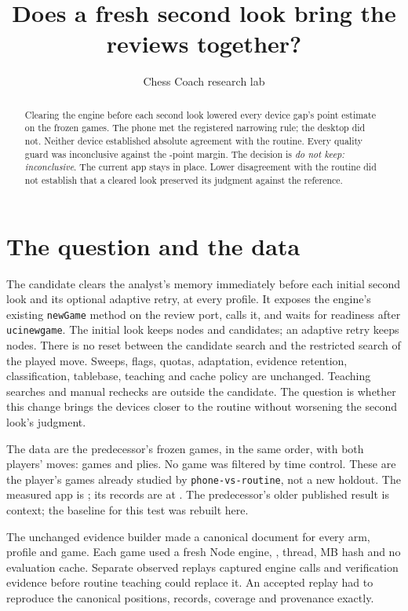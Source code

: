\documentclass[11pt]{article}
\title{Does a fresh second look bring the reviews together?}
\author{Chess Coach research lab}
\date{}
\begin{document}
\maketitle

\begin{abstract}
Clearing the engine before each second look lowered every device gap's point
estimate on the \Cases{} frozen games. The phone met the registered narrowing
rule; the desktop did not. Neither device established absolute agreement
with the routine. Every quality guard was inconclusive against the
\QualityMargin-point margin. The decision is \emph{do not keep: inconclusive}.
The current app stays in place. Lower disagreement with the routine did not
establish that a cleared look preserved its judgment against the reference.
\end{abstract}

\section{The question and the data}
The candidate clears the analyst's memory immediately before each initial
second look and its optional adaptive retry, at every profile. It exposes
the engine's existing \texttt{newGame} method on the review port, calls it,
and waits for readiness after \texttt{ucinewgame}. The initial look keeps
\VerifyNodes{} nodes and \Candidates{} candidates; an adaptive retry keeps
\AdaptiveNodes{} nodes. There is no reset between the candidate search and
the restricted search of the played move. Sweeps, flags, quotas, adaptation,
evidence retention, classification, tablebase, teaching and cache policy are
unchanged. Teaching searches and manual rechecks are outside the candidate.
The question is whether this change brings the devices closer to the routine
without worsening the second look's judgment.

The data are the predecessor's frozen games, in the same order, with both
players' moves: \Cases{} games and \Plies{} plies. \TimeControls{}
No game was filtered by time control. These are the player's games already
studied by \texttt{phone-vs-routine}, not a new holdout.
The measured app is \texttt{\AppCommit}; its records are at
\texttt{\RecordsCommit}. The predecessor's older published result is context;
the baseline for this test was rebuilt here.

The unchanged evidence builder made a canonical document for every arm,
profile and game. Each game used a fresh Node engine, \Engine,
\Threads{} thread, \HashSize{} MB hash and no evaluation cache.
Separate observed replays captured engine calls and verification evidence
before routine teaching could replace it. An accepted replay had to reproduce
the canonical positions, records, coverage and provenance exactly.
\end{document}
